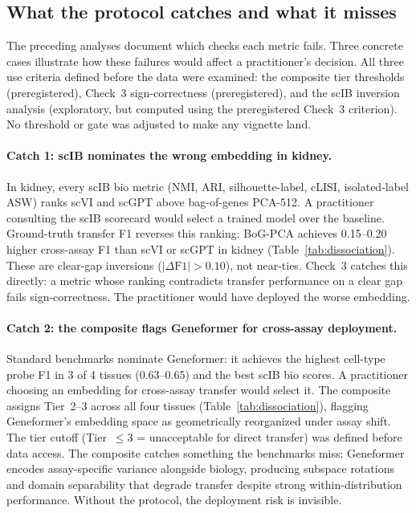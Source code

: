 \documentclass[9pt,lineno]{elife}
\begin{document}
\subsection{What the protocol catches and what it misses}

The preceding analyses document which checks each metric fails. Three concrete cases illustrate how these failures would affect a practitioner's decision. All three use criteria defined before the data were examined: the composite tier thresholds (preregistered), Check~3 sign-correctness (preregistered), and the scIB inversion analysis (exploratory, but computed using the preregistered Check~3 criterion). No threshold or gate was adjusted to make any vignette land.

\paragraph{Catch 1: scIB nominates the wrong embedding in kidney.} In kidney, every scIB bio metric (NMI, ARI, silhouette-label, cLISI, isolated-label ASW) ranks scVI and scGPT above bag-of-genes PCA-512. A practitioner consulting the scIB scorecard would select a trained model over the baseline. Ground-truth transfer F1 reverses this ranking: BoG-PCA achieves 0.15--0.20 higher cross-assay F1 than scVI or scGPT in kidney (Table~\ref{tab:dissociation}). These are clear-gap inversions ($|\Delta\text{F1}| > 0.10$), not near-ties. Check~3 catches this directly: a metric whose ranking contradicts transfer performance on a clear gap fails sign-correctness. The practitioner would have deployed the worse embedding.

\paragraph{Catch 2: the composite flags Geneformer for cross-assay deployment.} Standard benchmarks nominate Geneformer: it achieves the highest cell-type probe F1 in 3 of 4 tissues (0.63--0.65) and the best scIB bio scores. A practitioner choosing an embedding for cross-assay transfer would select it. The composite assigns Tier~2--3 across all four tissues (Table~\ref{tab:dissociation}), flagging Geneformer's embedding space as geometrically reorganized under assay shift. The tier cutoff (Tier~$\leq 3$ = unacceptable for direct transfer) was defined before data access. The composite catches something the benchmarks miss: Geneformer encodes assay-specific variance alongside biology, producing subspace rotations and domain separability that degrade transfer despite strong within-distribution performance. Without the protocol, the deployment risk is invisible.
\end{document}
